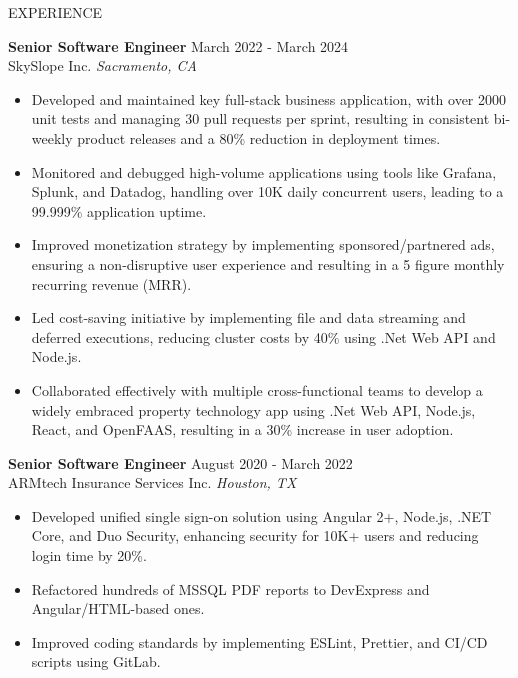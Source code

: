 \documentclass{basecv}
\begin{document}
\begin{rSection}{EXPERIENCE}

    \textbf{Senior Software Engineer} \hfill March 2022 - March 2024\\
    SkySlope Inc. \hfill \textit{Sacramento, CA}
    \begin{itemize}
        \itemsep -3pt {}
        \item Developed and maintained key full-stack business application, with over 2000 unit tests and managing 30 pull requests per sprint, resulting in consistent bi-weekly product releases and a 80\% reduction in deployment times.
        \item Monitored and debugged high-volume applications using tools like Grafana, Splunk, and Datadog, handling over 10K daily concurrent users, leading to a 99.999\% application uptime.
        \item Improved monetization strategy by implementing sponsored/partnered ads, ensuring a non-disruptive user experience and resulting in a 5 figure monthly recurring revenue (MRR).
        \item Led cost-saving initiative by implementing file and data streaming and deferred executions, reducing cluster costs by 40\% using .Net Web API and Node.js.
        \item Collaborated effectively with multiple cross-functional teams to develop a widely embraced property technology app using .Net Web API, Node.js, React, and OpenFAAS, resulting in a 30\% increase in user adoption.
    \end{itemize}

    \textbf{Senior Software Engineer} \hfill August 2020 - March 2022\\
    ARMtech Insurance Services Inc. \hfill \textit{Houston, TX}
    \begin{itemize}
        \itemsep -3pt {}
        \item Developed uniﬁed single sign-on solution using Angular 2+, Node.js, .NET Core, and Duo Security, enhancing security for 10K+ users and reducing login time by 20\%.
        \item Refactored hundreds of MSSQL PDF reports to DevExpress and Angular/HTML-based ones.
        \item Improved coding standards by implementing ESLint, Prettier, and CI/CD scripts using GitLab.
    \end{itemize}


\end{rSection}
\end{document}
